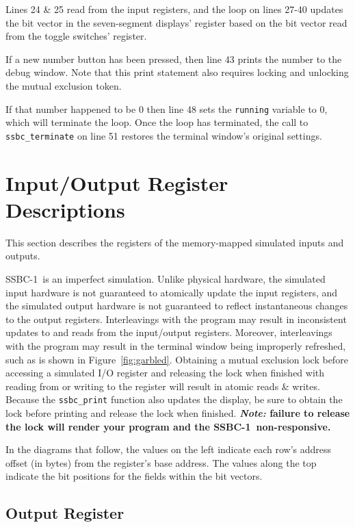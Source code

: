 \documentclass[12pt]{article}
\newcommand{\SSBC}{SSBC-1}
\begin{document}
Lines 24 \& 25 read from the input registers, and the loop on lines 27-40
updates the bit vector in the seven-segment displays' register based on the bit
vector read from the toggle switches' register.

If a new number button has been pressed, then line 43 prints the number to the
debug window. Note that this print statement also requires locking and
unlocking the mutual exclusion token.

If that number happened to be $0$ then line 48 sets the \texttt{running}
variable to 0, which will terminate the loop. Once the loop has terminated, the
call to \texttt{ssbc\_terminate} on line 51 restores the terminal window's
original settings.

\newpage \section{Input/Output Register Descriptions} \label{sec:registers}

This section describes the registers of the memory-mapped simulated inputs and
outputs.

\SSBC\ is an imperfect simulation. Unlike physical hardware, the simulated
input hardware is not guaranteed to atomically update the input registers, and
the simulated output hardware is not guaranteed to reflect instantaneous
changes to the output registers. Interleavings with the program may result in
inconsistent updates to and reads from the input/output registers. Moreover,
interleavings with the program may result in the terminal window being
improperly refreshed, such as is shown in Figure~\ref{fig:garbled}. Obtaining
a mutual exclusion lock before accessing a simulated I/O register and releasing
the lock when finished with reading from or writing to the register will result
in atomic reads \& writes. Because the \texttt{ssbc\_print} function also
updates the display, be sure to obtain the lock before printing and release the
lock when finished. \textbf{\textit{Note: }failure to release the lock will
render your program and the \SSBC\ non-responsive.}

In the diagrams that follow, the values on the left indicate each row's address
offset (in bytes) from the register's base address. The values along the top
indicate the bit positions for the fields within the bit vectors.

\subsection{Output Register}
\end{document}

